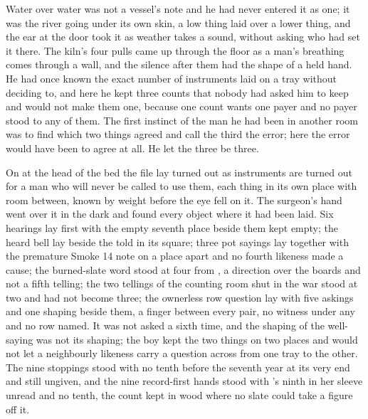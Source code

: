 Water over water was not a vessel's note and he had never entered it as one; it was the river going under its own skin, a low thing laid over a lower thing, and the ear at the door took it as weather takes a sound, without asking who had set it there. The kiln's four pulls came up through the floor as a man's breathing comes through a wall, and the silence after them had the shape of a held hand. He had once known the exact number of instruments laid on a tray without deciding to, and here he kept three counts that nobody had asked him to keep and would not make them one, because one count wants one payer and no payer stood to any of them. The first instinct of the man he had been in another room was to find which two things agreed and call the third the error; here the error would have been to agree at all. He let the three be three.

\scenebreak

On  at the head of the bed the file lay turned out as instruments are turned out for a man who will never be called to use them, each thing in its own place with room between, known by weight before the eye fell on it. The surgeon's hand went over it in the dark and found every object where it had been laid. Six hearings lay first with the empty seventh place beside them kept empty; the heard bell lay beside the told in its square; three pot sayings lay together with the premature Smoke 14 note on a place apart and no fourth likeness made a cause; the burned-slate word stood at four from , a direction over the boards and not a fifth telling; the two tellings of the counting room shut in the war stood at two and had not become three; the ownerless row question lay with five askings and one shaping beside them, a finger between every pair, no witness under any and no row named. It was not asked a sixth time, and the shaping of the well-saying was not its shaping; the boy kept the two things on two places and would not let a neighbourly likeness carry a question across from one tray to the other. The nine stoppings stood with no tenth before the seventh year at its very end and still ungiven, and the nine record-first hands stood with 's ninth in her sleeve unread and no tenth, the count kept in wood where no slate could take a figure off it.

